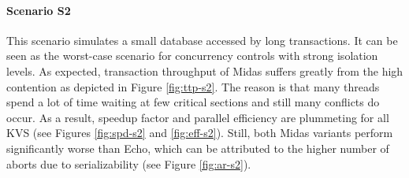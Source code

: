 \paragraph{Scenario S2}

This scenario simulates a small database accessed by long transactions. It can
be seen as the worst-case scenario for concurrency controls with strong
isolation levels. As expected, transaction throughput of Midas suffers greatly
from the high contention as depicted in Figure \ref{fig:ttp-s2}. The reason is
that many threads spend a lot of time waiting at few critical sections and still
many conflicts do occur. As a result, speedup factor and parallel efficiency are
plummeting for all KVS (see Figures \ref{fig:spd-s2} and \ref{fig:eff-s2}).
Still, both Midas variants perform significantly worse than Echo, which can be
attributed to the higher number of aborts due to serializability (see Figure
\ref{fig:ar-s2}).

